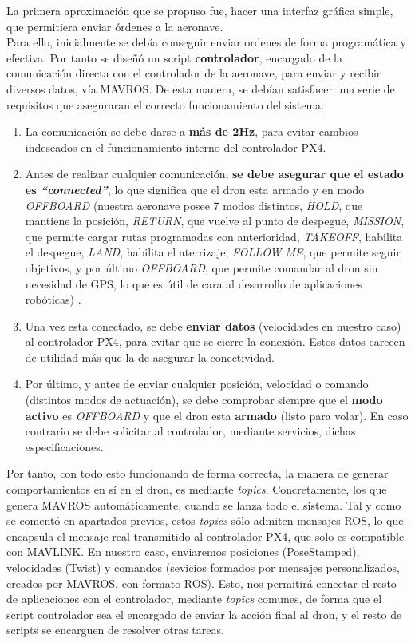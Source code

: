 La primera aproximación que se propuso fue, hacer una interfaz gráfica simple, que permitiera enviar órdenes a la aeronave.\\

Para ello, inicialmente se debía conseguir enviar ordenes de forma programática y efectiva. Por tanto se diseñó un script \textbf{controlador}, encargado de la comunicación directa con el controlador de la aeronave, para enviar y recibir diversos datos, vía MAVROS. De esta manera, se debían satisfacer una serie de requisitos que aseguraran el correcto funcionamiento del sistema:

\begin{enumerate}
	\item La comunicación se debe darse a \textbf{más de 2Hz}, para evitar cambios indeseados en el funcionamiento interno del controlador PX4.

	\item Antes de realizar cualquier comunicación, \textbf{se debe asegurar que el estado es \emph{``connected''}}, lo que significa que el dron esta armado y en modo \emph{OFFBOARD} (nuestra aeronave posee 7 modos distintos, \emph{HOLD}, que mantiene la posición, \emph{RETURN}, que vuelve al punto de despegue, \emph{MISSION}, que permite cargar rutas programadas con anterioridad, \emph{TAKEOFF}, habilita el despegue, \emph{LAND}, habilita el aterrizaje, \emph{FOLLOW ME}, que permite seguir objetivos, y por último \emph{OFFBOARD}, que permite comandar al dron sin necesidad de GPS, lo que es útil de cara al desarrollo de aplicaciones robóticas) \cite{flight-modes}.
	
    \item Una vez esta conectado, se debe \textbf{enviar datos} (velocidades en nuestro caso) al controlador PX4, para evitar que se cierre la conexión. Estos datos carecen de utilidad más que la de asegurar la conectividad.
    
    \item Por último, y antes de enviar cualquier posición, velocidad o comando (distintos modos de actuación), se debe comprobar siempre que el \textbf{modo activo} es \emph{OFFBOARD} y que el dron esta \textbf{armado} (listo para volar). En caso contrario se debe solicitar al controlador, mediante servicios, dichas especificaciones.
\end{enumerate}

Por tanto, con todo esto funcionando de forma correcta, la manera de generar comportamientos en sí en el dron, es mediante \emph{topics}. Concretamente, los que genera MAVROS automáticamente, cuando se lanza todo el sistema. Tal y como se comentó en apartados previos, estos \emph{topics} sólo admiten mensajes \ac{ROS}, lo que encapsula el mensaje real transmitido al controlador PX4, que solo es compatible con MAVLINK. En nuestro caso, enviaremos posiciones (PoseStamped), velocidades (Twist) y comandos (sevicios formados por mensajes personalizados, creados por MAVROS, con formato \ac{ROS}). Esto, nos permitirá conectar el resto de aplicaciones con el controlador, mediante \emph{topics} comunes, de forma que el script controlador sea el encargado de enviar la acción final al dron, y el resto de scripts se encarguen de resolver otras tareas.\\

